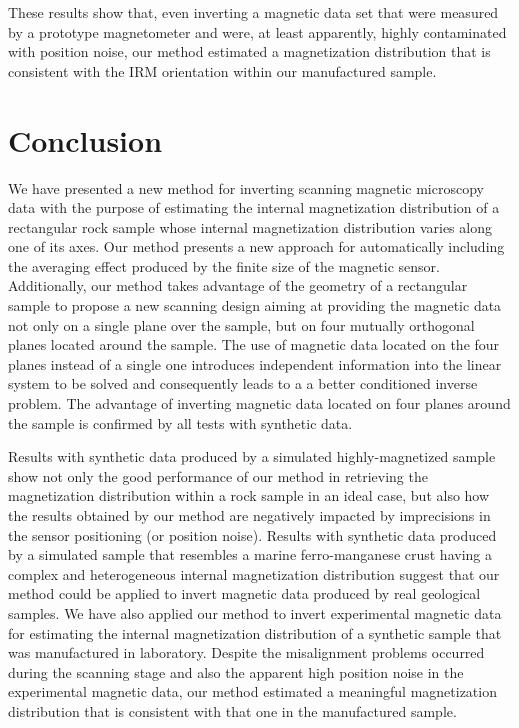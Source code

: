 \documentclass[draft,gc]{agutex}
\begin{document}
\begin{article}
These results show that, even inverting a magnetic data set that
were measured by a prototype magnetometer and were, at least apparently,
highly contaminated with position noise, our method estimated a 
magnetization distribution that is consistent with the IRM orientation
within our manufactured sample.

\section{Conclusion}

We have presented a new method for inverting scanning magnetic
microscopy data with the purpose of estimating the internal 
magnetization distribution of a rectangular rock sample whose
internal magnetization distribution varies along one of its
axes.
Our method presents a new approach for automatically including
the averaging effect produced by the finite size of the 
magnetic sensor. Additionally, our method takes advantage 
of the geometry of a rectangular sample
to propose a new scanning design aiming at providing the magnetic
data not only on a single plane over the sample, but on four 
mutually orthogonal planes located around the sample.
The use of magnetic data located on the four planes instead
of a single one introduces independent information into the
linear system to be solved and consequently leads to a
a better conditioned inverse problem.
The advantage of inverting magnetic data located on four planes
around the sample is confirmed by all tests with synthetic data.

Results with synthetic data produced by a simulated highly-magnetized 
sample show not only the good performance of 
our method in retrieving the magnetization distribution within a 
rock sample in an ideal case, but also how the results obtained by our 
method are negatively impacted by imprecisions in the sensor positioning
(or position noise).
Results with synthetic data produced by a simulated sample that 
resembles a marine ferro-manganese crust having a complex and heterogeneous 
internal magnetization distribution suggest that our method could be
applied to invert magnetic data produced by real geological samples.
We have also applied our method to invert experimental magnetic data
for estimating the internal magnetization 
distribution of a synthetic sample that was manufactured in 
laboratory.
Despite the misalignment problems occurred during the scanning stage
and also the apparent high position noise in the experimental magnetic
data, our method estimated a meaningful magnetization distribution that 
is consistent with that one in the manufactured sample.


\end{article}
\end{document}
